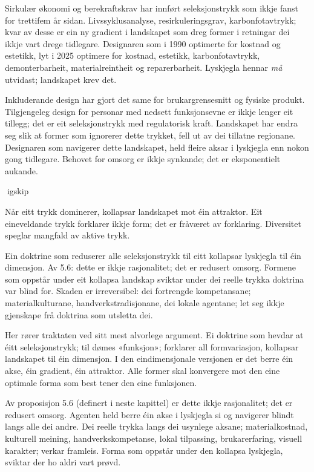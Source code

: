 Sirkulær økonomi og berekraftskrav har innført seleksjonstrykk som ikkje fanst for trettifem år sidan. Livssyklusanalyse, resirkuleringsgrav, karbonfotavtrykk; kvar av desse er ein ny gradient i landskapet som dreg former i retningar dei ikkje vart drege tidlegare. Designaren som i 1990 optimerte for kostnad og estetikk, lyt i 2025 optimere for kostnad, estetikk, karbonfotavtrykk, demonterbarheit, materialreintheit og reparerbarheit. Lyskjegla hennar \textit{må} utvidast; landskapet krev det.

Inkluderande design har gjort det same for brukargrensesnitt og fysiske produkt. Tilgjengeleg design for personar med nedsett funksjonsevne er ikkje lenger eit tillegg; det er eit seleksjonstrykk med regulatorisk kraft. Landskapet har endra seg slik at former som ignorerer dette trykket, fell ut av dei tillatne regionane. Designaren som navigerer dette landskapet, held fleire aksar i lyskjegla enn nokon gong tidlegare. Behovet for omsorg er ikkje synkande; det er eksponentielt aukande.

igskip

Når eitt trykk dominerer, kollapsar landskapet mot éin attraktor. Eit eineveldande trykk forklarer ikkje form; det er fråværet av forklaring. Diversitet speglar mangfald av aktive trykk.

Ein doktrine som reduserer alle seleksjonstrykk til eitt kollapsar lyskjegla til éin dimensjon. Av 5.6: dette er ikkje rasjonalitet; det er redusert omsorg. Formene som oppstår under eit kollapsa landskap sviktar under dei reelle trykka doktrina var blind for. Skaden er irreversibel: dei fortrengde kompetansane; materialkulturane, handverkstradisjonane, dei lokale agentane; let seg ikkje gjenskape frå doktrina som utsletta dei.

Her rører traktaten ved sitt mest alvorlege argument. Ei doktrine som hevdar at éitt seleksjonstrykk; til dømes «funksjon»; forklarer all formvariasjon, kollapsar landskapet til éin dimensjon. I den eindimensjonale versjonen er det berre éin akse, éin gradient, éin attraktor. Alle former skal konvergere mot den eine optimale forma som best tener den eine funksjonen.

Av proposisjon 5.6 (definert i neste kapittel) er dette ikkje rasjonalitet; det er redusert omsorg. Agenten held berre éin akse i lyskjegla si og navigerer blindt langs alle dei andre. Dei reelle trykka langs dei usynlege aksane; materialkostnad, kulturell meining, handverkskompetanse, lokal tilpassing, brukarerfaring, visuell karakter; verkar framleis. Forma som oppstår under den kollapsa lyskjegla, sviktar der ho aldri vart prøvd.

